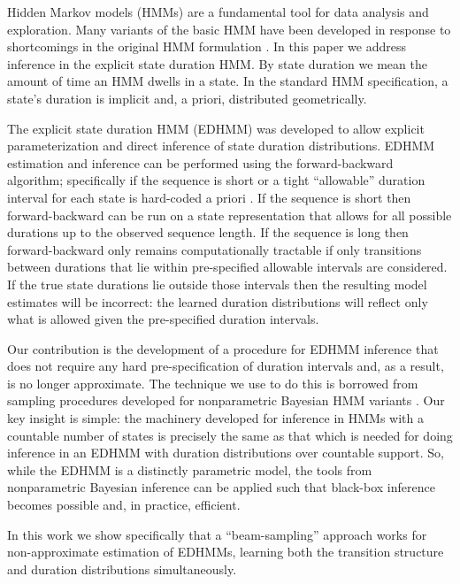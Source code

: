 \label{section}
Hidden Markov models (HMMs) are a fundamental tool for data analysis and exploration.  Many variants of the basic HMM have been developed in response to shortcomings in the original HMM formulation \cite{Rabiner89}.  In this paper we address inference in the explicit state duration HMM.  By state duration we mean the amount of time an HMM dwells in a state.  In the standard HMM specification, a state's duration is implicit and, a priori, distributed geometrically.

The explicit state duration HMM (EDHMM) \cite{Rabiner89} was developed to allow explicit parameterization and direct inference of state duration distributions.   EDHMM estimation and inference can be performed using the forward-backward algorithm; specifically if the sequence is short or a tight ``allowable'' duration interval for each state is hard-coded a priori \cite{Yu2006}.   If the sequence is short then forward-backward can be run on a state representation that allows for all possible durations up to the observed sequence length.  If the sequence is long then forward-backward only remains computationally tractable if only transitions between durations that lie within pre-specified allowable intervals are considered.   If the true state durations lie outside those intervals then the resulting model estimates will be incorrect: the learned duration distributions will reflect only what is allowed given the pre-specified duration intervals. %

Our contribution is the development of a procedure for EDHMM inference that does not require any hard pre-specification of duration intervals and, as a result, is no longer approximate.  The technique we use to do this 
is borrowed from sampling procedures developed for nonparametric  Bayesian HMM variants \cite{vanGael2008}.  Our key insight is simple: the machinery developed for inference in HMMs with a countable number of states is precisely the same as that which is needed for doing inference in an EDHMM with duration distributions over countable support.  So, while the EDHMM is a distinctly parametric model, the tools from nonparametric Bayesian inference can be applied such that black-box inference becomes possible and, in practice, efficient.

In this work we show specifically that a ``beam-sampling'' approach  \cite{vanGael2008} works for non-approximate estimation of EDHMMs, learning both the transition structure and duration distributions simultaneously.

